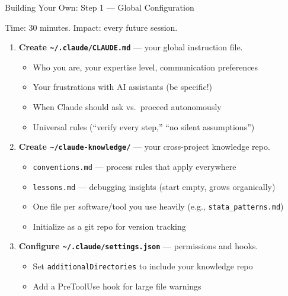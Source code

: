 \documentclass[aspectratio=169,11pt]{beamer}
\begin{document}
\begin{frame}{Building Your Own: Step 1 --- Global Configuration}

\begin{exampleblock}{Time: 30 minutes. Impact: every future session.}
\end{exampleblock}

\begin{enumerate}\small
  \item \textbf{Create \texttt{\textasciitilde/.claude/CLAUDE.md}} --- your global instruction file.
    \begin{itemize}\footnotesize
      \item Who you are, your expertise level, communication preferences
      \item Your frustrations with AI assistants (be specific!)
      \item When Claude should ask vs.\ proceed autonomously
      \item Universal rules (``verify every step,'' ``no silent assumptions'')
    \end{itemize}

  \item \textbf{Create \texttt{\textasciitilde/claude-knowledge/}} --- your cross-project knowledge repo.
    \begin{itemize}\footnotesize
      \item \texttt{conventions.md} --- process rules that apply everywhere
      \item \texttt{lessons.md} --- debugging insights (start empty, grows organically)
      \item One file per software/tool you use heavily (e.g., \texttt{stata\_patterns.md})
      \item Initialize as a git repo for version tracking
    \end{itemize}

  \item \textbf{Configure \texttt{\textasciitilde/.claude/settings.json}} --- permissions and hooks.
    \begin{itemize}\footnotesize
      \item Set \texttt{additionalDirectories} to include your knowledge repo
      \item Add a PreToolUse hook for large file warnings
    \end{itemize}
\end{enumerate}

\end{frame}
\end{document}
